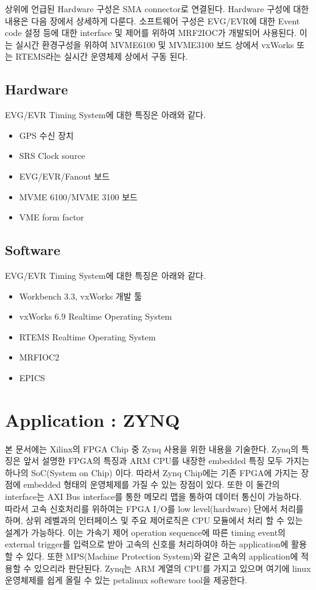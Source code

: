 \documentclass[11pt
-  , a4paper
  , article
  , oneside
]{memoir}
\begin{document}
\begin{multicols}{2}
상위에 언급된 Hardware 구성은 SMA connector로 연결된다. Hardware 구성에 대한 내용은 다음 장에서 상세하게 다룬다. 소프트웨어 구성은 EVG/EVR에 대한 Event code 설정 등에 대한 interface 및 제어를 위하여 MRF2IOC가 개발되어 사용된다. 이는 실시간 환경구성을 위하여 MVME6100 및 MVME3100 보드 상에서 vxWorks 또는 RTEMS라는 실시간 운영체제 상에서 구동 된다.

\section{Hardware}
EVG/EVR Timing System에 대한 특징은 아래와 같다.
\begin{itemize}
	\item GPS 수신 장치
	\item SRS Clock source
	\item EVG/EVR/Fanout 보드
	\item MVME 6100/MVME 3100 보드 
	\item VME form factor		
\end{itemize}
	

\section{Software}
EVG/EVR Timing System에 대한 특징은 아래와 같다.
\begin{itemize}
	\item Workbench 3.3, vxWorks 개발 툴
	\item vxWorks 6.9 Realtime Operating System
	\item RTEMS Realtime Operating System
	\item MRFIOC2  
	\item EPICS		
\end{itemize}

	


\hfil\break

\chapter{Application : ZYNQ  }
본 문서에는 Xilinx의 FPGA Chip 중 Zynq 사용을 위한 내용을 기술한다. Zynq의 특징은 앞서 설명한 FPGA의 특징과 ARM CPU를 내장한 embedded 특징 모두 가지는 하나의 SoC(System on Chip) 이다.  따라서 Zynq Chip에는 기존 FPGA에 가지는 장점에 embedded 형태의 운영체제를 가질 수 있는 장점이 있다. 또한 이 둘간의 interface는 AXI Bus interface를 통한 메모리 맵을 통하여 데이터 통신이 가능하다. 따라서 고속 신호처리를 위하여는 FPGA I/O를 low level(hardware) 단에서 처리를 하며, 상위 레벨과의 인터페이스 및 주요 제어로직은 CPU 모듈에서 처리 할 수 있는 설계가 가능하다. 이는 가속기 제어 operation sequence에 따른 timing event의 external trigger를 입력으로 받아 고속의 신호를 처리하여야 하는 application에 활용 할 수 있다. 또한 MPS(Machine Protection System)와 같은 고속의 application에 적용할 수 있으리라 판단된다.
Zynq는 ARM 계열의 CPU를 가지고 있으며 여기에 linux 운영체제를 쉽게 올릴 수 있는 petalinux softeware tool을 제공한다. 


\end{multicols}
\end{document}
